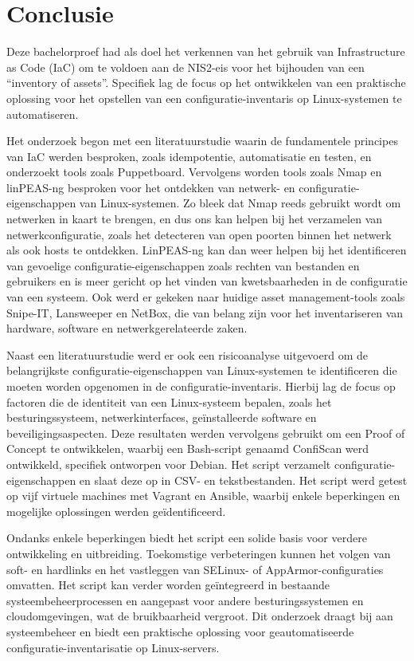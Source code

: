 
\chapter{Conclusie}%
\label{ch:conclusie}

Deze bachelorproef had als doel het verkennen van het gebruik van Infrastructure as Code (IaC) om te voldoen aan de NIS2-eis voor het bijhouden van een ``inventory of assets''.
Specifiek lag de focus op het ontwikkelen van een praktische oplossing voor het opstellen van een configuratie-inventaris op Linux-systemen te automatiseren.

Het onderzoek begon met een literatuurstudie waarin de fundamentele principes van IaC werden besproken, zoals idempotentie, automatisatie en testen, en onderzoekt tools zoals Puppetboard.
Vervolgens worden tools zoals Nmap en linPEAS-ng besproken voor het ontdekken van netwerk- en configuratie-eigenschappen van Linux-systemen.
Zo bleek dat Nmap reeds gebruikt wordt om netwerken in kaart te brengen, en dus ons kan helpen bij het verzamelen van netwerkconfiguratie, zoals het detecteren van open poorten binnen het netwerk als ook hosts te ontdekken.
LinPEAS-ng kan dan weer helpen bij het identificeren van gevoelige configuratie-eigenschappen zoals rechten van bestanden en gebruikers en is meer gericht op het vinden van kwetsbaarheden in de configuratie van een systeem.
Ook werd er gekeken naar huidige asset management-tools zoals Snipe-IT, Lansweeper en NetBox, die van belang zijn voor het inventariseren van hardware, software en netwerkgerelateerde zaken.

Naast een literatuurstudie werd er ook een risicoanalyse uitgevoerd om de belangrijkste configuratie-eigenschappen van Linux-systemen te identificeren die moeten worden opgenomen in de configuratie-inventaris.
Hierbij lag de focus op factoren die de identiteit van een Linux-systeem bepalen, zoals het besturingssysteem, netwerkinterfaces, ge\"installeerde software en beveiligingsaspecten.
Deze resultaten werden vervolgens gebruikt om een Proof of Concept te ontwikkelen, waarbij een Bash-script genaamd ConfiScan werd ontwikkeld, specifiek ontworpen voor Debian.
Het script verzamelt configuratie-eigenschappen en slaat deze op in CSV- en tekstbestanden.
Het script werd getest op vijf virtuele machines met Vagrant en Ansible, waarbij enkele beperkingen en mogelijke oplossingen werden ge\"identificeerd.

Ondanks enkele beperkingen biedt het script een solide basis voor verdere ontwikkeling en uitbreiding.
Toekomstige verbeteringen kunnen het volgen van soft- en hardlinks en het vastleggen van SELinux- of AppArmor-configuraties omvatten.
Het script kan verder worden ge\"integreerd in bestaande systeembeheerprocessen en aangepast voor andere besturingssystemen en cloudomgevingen, wat de bruikbaarheid vergroot.
Dit onderzoek draagt bij aan systeembeheer en biedt een praktische oplossing voor geautomatiseerde configuratie-inventarisatie op Linux-servers.
